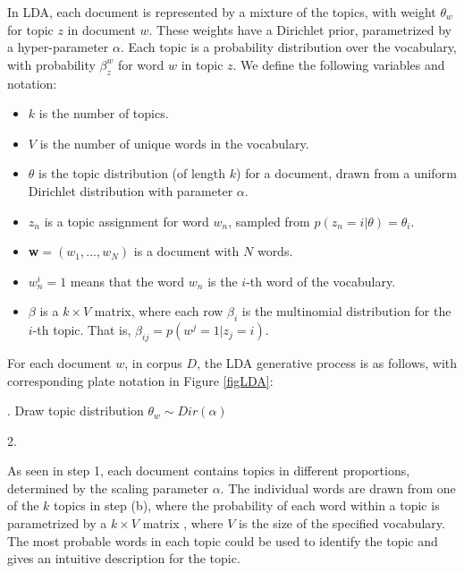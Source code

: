 \documentclass[12pt]{report}
\begin{document}
In LDA, each document is represented by a mixture of the topics, with
weight $\theta_w$ for topic
$z$ in document $w$. These weights have a Dirichlet
prior, parametrized by a hyper-parameter $\alpha$. Each topic is a
probability distribution over the vocabulary, with probability
$\beta^w_z$ for word $w$ in topic $z$. We define the following
variables and notation:
\begin{itemize}
  \item[] $k$ is the number of topics.
  \item[] $V$ is the number of unique words in the vocabulary.
  \item[] $\theta$  is the topic distribution (of length $k$) for a document,
   drawn from a uniform Dirichlet distribution with parameter $\alpha$.
 \item[] $z_{n}$ is a topic assignment for word $w_{n}$, 
 sampled from $p(z_{n} = i|\theta) = \theta_{i}$.
  \item[] \textbf{w}$ = (w_{1}, ... , w_{N})$ is a document with $N$ words.
  \item[] $w_{n}^{i} = 1$ means that the word $w_{n}$ is the $i$-th word 
  of the vocabulary.
  \item[] $\beta$  is a $k \times V$ matrix, where each row $\beta_{i}$ 
  is the multinomial distribution for the $i$-th topic. That is, 
  $\beta_{ij} = p(w^{j} = 1 | z_{j} = i)$.
\end{itemize}

For each document $w$, in corpus $D$, the LDA generative process is as follows, 
with corresponding plate notation in Figure \ref{figLDA}:

\begin{algorithm}[H]
. Draw topic distribution $\theta_w \sim Dir(\alpha)$

2. 
\end{algorithm}

As seen in step 1, each document contains topics in different proportions,
determined by the scaling parameter $\alpha$. The individual words are drawn
from one of the $k$ topics in step (b), where the probability of each word
within a topic is parametrized by a $k \times V$ matrix , where $V$ is the
size of the specified vocabulary. The most probable words in each topic could
be used to identify the topic and gives an intuitive description for the topic.
\end{document}
